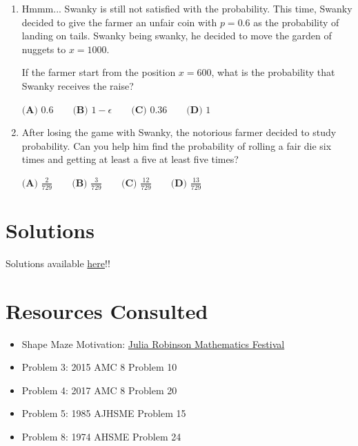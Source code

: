 \documentclass{article}
\begin{document}
\begin{enumerate}[itemsep=1.8em]
The farm has a fence at position $x = 0$ and a
garden of nuggets at position $x = 10$. If the farmer
ever hits the fence, he loses, and Swanky receives
the raise. On the other hand, Swanky loses if the
farmer reaches the nugget garden.

What is the probability that the farmer loses if
he starts from position $x = 4$?

$
\textbf{(A) } \frac{1}{2} \qquad
\textbf{(B) } \frac{1}{3} \qquad
\textbf{(C) } \frac{2}{5} \qquad
\textbf{(D) } \frac{9}{25}
$

\item
Hmmm... Swanky is still not satisfied with the
probability. This time, Swanky decided to give the
farmer an unfair coin with $p = 0.6$ as the probability
of landing on tails. Swanky being swanky, he decided
to move the garden of nuggets to $x = 1000$.

If the farmer start from the position $x = 600$,
what is the probability that Swanky receives the raise?

$
\textbf{(A) } 0.6          \qquad
\textbf{(B) } 1 - \epsilon \qquad
\textbf{(C) } 0.36         \qquad
\textbf{(D) } 1
$

\item
After losing the game with Swanky, the notorious
farmer decided to study probability. Can you help
him find the probability of rolling a fair die six
times and getting at least a five at least five times?

$
\textbf{(A) } \frac{2}{729}  \qquad
\textbf{(B) } \frac{3}{729}  \qquad
\textbf{(C) } \frac{12}{729} \qquad
\textbf{(D) } \frac{13}{729}
$
\end{enumerate}


\section{Solutions}
Solutions available
\href{https://drive.google.com/file/d/1bC1j62365YgbhzAENrZrXA1RmlCdEhc-/view?usp=sharing}{here}!!


\section{Resources Consulted}
\begin{itemize}
\item
Shape Maze Motivation:
\href{https://jrmf.org/wp-content/uploads/Shape-Mazes-Activity-Guide.pdf}
{Julia Robinson Mathematics Festival}

\item
Problem 3: 2015 AMC 8 Problem 10
\item
Problem 4: 2017 AMC 8 Problem 20
\item
Problem 5: 1985 AJHSME Problem 15
\item
Problem 8: 1974 AHSME Problem 24
\end{itemize}
\end{document}
